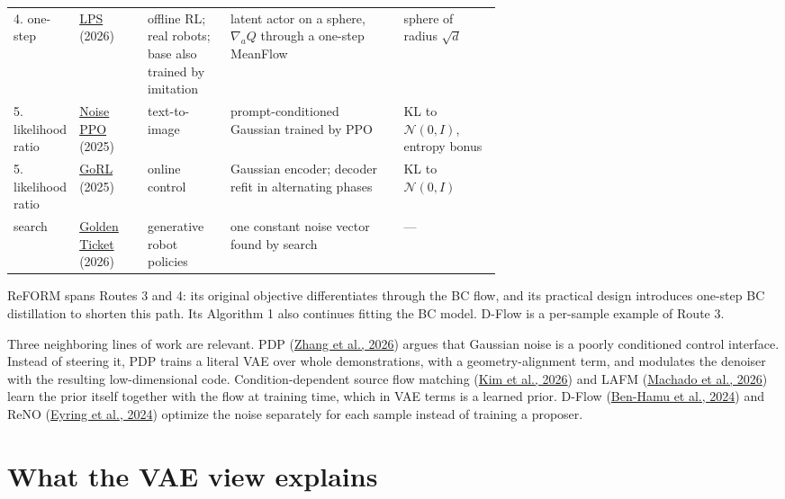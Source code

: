 \begin{table}[htbp]
\begin{tabularx}{\linewidth}{@{}>{\raggedright}p{0.12\linewidth}>{\raggedright}p{0.14\linewidth}>{\raggedright}p{0.17\linewidth}>{\raggedright}X>{\raggedright\arraybackslash}p{0.2\linewidth}@{}}
4. one-step & \hyperlink{ref:12}{LPS} (2026) & offline RL; real robots; base also trained by imitation & latent actor on a sphere, $\nabla_a Q$ through a one-step MeanFlow & sphere of radius $\sqrt{d}$ \\
5. likelihood ratio & \hyperlink{ref:5}{Noise PPO} (2025) & text-to-image & prompt-conditioned Gaussian trained by PPO & KL to $\mathcal{N}(0, I)$, entropy bonus \\
5. likelihood ratio & \hyperlink{ref:9}{GoRL} (2025) & online control & Gaussian encoder; decoder refit in alternating phases & KL to $\mathcal{N}(0, I)$ \\
search & \hyperlink{ref:17}{Golden Ticket} (2026) & generative robot policies & one constant noise vector found by search & --- \\
\bottomrule
\end{tabularx}
\end{table}

ReFORM spans Routes 3 and 4: its original objective differentiates through the BC flow, and its practical design introduces one-step BC distillation to shorten this path. Its Algorithm 1 also continues fitting the BC model. D-Flow is a per-sample example of Route 3.

Three neighboring lines of work are relevant. PDP (\hyperlink{ref:18}{Zhang et al., 2026}) argues that Gaussian noise is a poorly conditioned control interface. Instead of steering it, PDP trains a literal VAE over whole demonstrations, with a geometry-alignment term, and modulates the denoiser with the resulting low-dimensional code. Condition-dependent source flow matching (\hyperlink{ref:19}{Kim et al., 2026}) and LAFM (\hyperlink{ref:20}{Machado et al., 2026}) learn the prior itself together with the flow at training time, which in VAE terms is a learned prior. D-Flow (\hyperlink{ref:8}{Ben-Hamu et al., 2024}) and ReNO (\hyperlink{ref:7}{Eyring et al., 2024}) optimize the noise separately for each sample instead of training a proposer.

\section{What the VAE view explains}
\label{sec:6}
